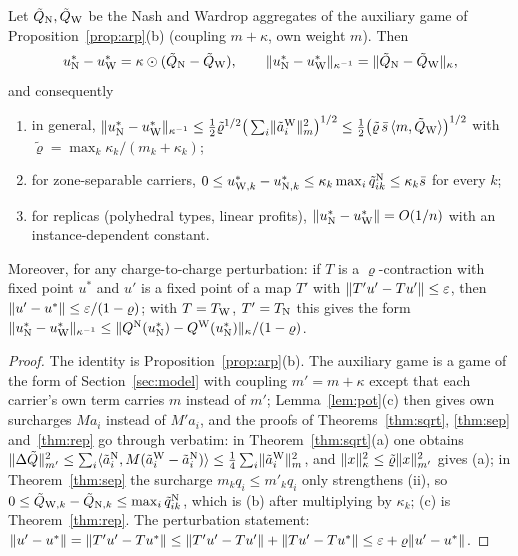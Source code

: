 \begin{theorem}\label{thm:toll}
Let $\tilde Q_{\mathrm{N}},\tilde Q_{\mathrm{W}}$ be the Nash and Wardrop aggregates of the auxiliary game of Proposition~\ref{prop:arp}(b) (coupling $m+\kappa$, own weight $m$). Then
\[
u_{\mathrm{N}}^*-u_{\mathrm{W}}^*=\kappa\odot(\tilde Q_{\mathrm{N}}-\tilde Q_{\mathrm{W}}),\qquad
\lVert u_{\mathrm{N}}^*-u_{\mathrm{W}}^*\rVert_{\kappa^{-1}}=\lVert \tilde Q_{\mathrm{N}}-\tilde Q_{\mathrm{W}}\rVert_\kappa ,
\]
and consequently
\begin{enumerate}
\item[(a)] in general, $\lVert u_{\mathrm{N}}^*-u_{\mathrm{W}}^*\rVert_{\kappa^{-1}}\le\tfrac12\tilde\varrho^{1/2}\big(\sum_i\lVert \tilde a_i^{\mathrm{W}}\rVert_m^2\big)^{1/2}\le\tfrac12\big(\tilde\varrho\,\bar s\,\langle m,\tilde Q_{\mathrm{W}}\rangle\big)^{1/2}$ with $\tilde\varrho=\max_k\kappa_k/(m_k+\kappa_k)$;
\item[(b)] for zone-separable carriers, $0\le u_{\mathrm{W},k}^*-u_{\mathrm{N},k}^*\le\kappa_k\max_i\tilde q_{ik}^{\mathrm{N}}\le\kappa_k\bar s$ for every $k$;
\item[(c)] for replicas (polyhedral types, linear profits), $\lVert u_{\mathrm{N}}^*-u_{\mathrm{W}}^*\rVert=O(1/n)$ with an instance-dependent constant.
\end{enumerate}
Moreover, for any charge-to-charge perturbation: if $T$ is a $\varrho$-contraction with fixed point $u^*$ and $u'$ is a fixed point of a map $T'$ with $\lVert T'u'-Tu'\rVert\le\varepsilon$, then $\lVert u'-u^*\rVert\le\varepsilon/(1-\varrho)$; with $T=T_{\mathrm{W}}$, $T'=T_{\mathrm{N}}$ this gives the form $\lVert u_{\mathrm{N}}^*-u_{\mathrm{W}}^*\rVert_{\kappa^{-1}}\le\lVert Q^{\mathrm{N}}(u_{\mathrm{N}}^*)-Q^{\mathrm{W}}(u_{\mathrm{N}}^*)\rVert_\kappa/(1-\varrho)$.
\end{theorem}
\begin{proof}
The identity is Proposition~\ref{prop:arp}(b). The auxiliary game is a game of the form of Section~\ref{sec:model} with coupling $m'=m+\kappa$ except that each carrier's own term carries $m$ instead of $m'$; Lemma~\ref{lem:pot}(c) then gives own surcharges $Ma_i$ instead of $M'a_i$, and the proofs of Theorems~\ref{thm:sqrt}, \ref{thm:sep} and~\ref{thm:rep} go through verbatim: in Theorem~\ref{thm:sqrt}(a) one obtains $\lVert \Delta\tilde Q\rVert_{m'}^2\le\sum_i\langle \tilde a_i^{\mathrm{N}},M(\tilde a_i^{\mathrm{W}}-\tilde a_i^{\mathrm{N}})\rangle\le\tfrac14\sum_i\lVert \tilde a_i^{\mathrm{W}}\rVert_m^2$, and $\lVert x\rVert_\kappa^2\le\tilde\varrho\lVert x\rVert_{m'}^2$ gives (a); in Theorem~\ref{thm:sep} the surcharge $m_kq_i\le m'_kq_i$ only strengthens (ii), so $0\le\tilde Q_{\mathrm{W},k}-\tilde Q_{\mathrm{N},k}\le\max_i\tilde q_{ik}^{\mathrm{N}}$, which is (b) after multiplying by $\kappa_k$; (c) is Theorem~\ref{thm:rep}. The perturbation statement: $\lVert u'-u^*\rVert=\lVert T'u'-Tu^*\rVert\le\lVert T'u'-Tu'\rVert+\lVert Tu'-Tu^*\rVert\le\varepsilon+\varrho\lVert u'-u^*\rVert$.
\end{proof}

